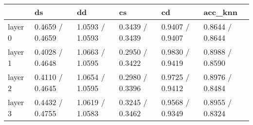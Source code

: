 \begin{tabular}{llllll}
\toprule
{} &               ds &               dd &               cs &               cd &          acc\_knn \\
\midrule
layer 0 &  0.4659 / 0.4659 &  1.0593 / 1.0593 &  0.3439 / 0.3439 &  0.9407 / 0.9407 &  0.8644 / 0.8644 \\
layer 1 &  0.4028 / 0.4648 &  1.0663 / 1.0595 &  0.2950 / 0.3422 &  0.9830 / 0.9419 &  0.8988 / 0.8590 \\
layer 2 &  0.4110 / 0.4645 &  1.0654 / 1.0595 &  0.2980 / 0.3396 &  0.9725 / 0.9412 &  0.8976 / 0.8484 \\
layer 3 &  0.4432 / 0.4755 &  1.0619 / 1.0583 &  0.3245 / 0.3462 &  0.9568 / 0.9349 &  0.8955 / 0.8324 \\
\bottomrule
\end{tabular}
